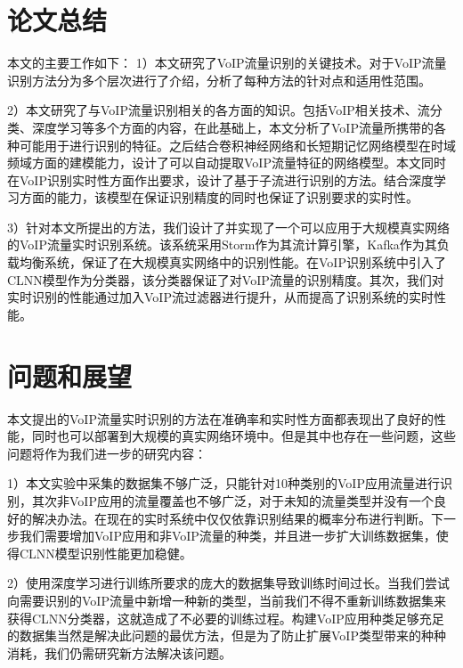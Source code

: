 \section{论文总结}

本文的主要工作如下：
1）本文研究了VoIP流量识别的关键技术。对于VoIP流量识别方法分为多个层次进行了介绍，分析了每种方法的针对点和适用性范围。

2）本文研究了与VoIP流量识别相关的各方面的知识。包括VoIP相关技术、流分类、深度学习等多个方面的内容，在此基础上，本文分析了VoIP流量所携带的各种可能用于进行识别的特征。之后结合卷积神经网络和长短期记忆网络模型在时域频域方面的建模能力，设计了可以自动提取VoIP流量特征的网络模型。本文同时在VoIP识别实时性方面作出要求，设计了基于子流进行识别的方法。结合深度学习方面的能力，该模型在保证识别精度的同时也保证了识别要求的实时性。

3）针对本文所提出的方法，我们设计了并实现了一个可以应用于大规模真实网络的VoIP流量实时识别系统。该系统采用Storm作为其流计算引擎，Kafka作为其负载均衡系统，保证了在大规模真实网络中的识别性能。在VoIP识别系统中引入了CLNN模型作为分类器，该分类器保证了对VoIP流量的识别精度。其次，我们对实时识别的性能通过加入VoIP流过滤器进行提升，从而提高了识别系统的实时性能。



\section{问题和展望}
本文提出的VoIP流量实时识别的方法在准确率和实时性方面都表现出了良好的性能，同时也可以部署到大规模的真实网络环境中。但是其中也存在一些问题，这些问题将作为我们进一步的研究内容：

1）本文实验中采集的数据集不够广泛，只能针对10种类别的VoIP应用流量进行识别，其次非VoIP应用的流量覆盖也不够广泛，对于未知的流量类型并没有一个良好的解决办法。在现在的实时系统中仅仅依靠识别结果的概率分布进行判断。下一步我们需要增加VoIP应用和非VoIP流量的种类，并且进一步扩大训练数据集，使得CLNN模型识别性能更加稳健。

2）使用深度学习进行训练所要求的庞大的数据集导致训练时间过长。当我们尝试向需要识别的VoIP流量中新增一种新的类型，当前我们不得不重新训练数据集来获得CLNN分类器，这就造成了不必要的训练过程。构建VoIP应用种类足够充足的数据集当然是解决此问题的最优方法，但是为了防止扩展VoIP类型带来的种种消耗，我们仍需研究新方法解决该问题。




